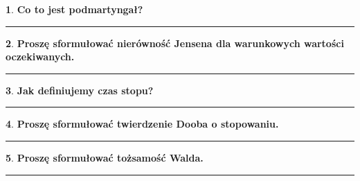 \documentclass[
    twocolumn,
    twoside,
    fontsize=11pt,
    paper=A0,
    DIV=30
]{scrartcl}
\theoremstyle{definition}
\newtheorem{pytanie}{}
\theoremstyle{break}
\newenvironment{odpowiedź}{\vspace{-0.7em}}{\vspace{0.3em}\hrule}
\begin{document}
\begin{pytanie}
\textbf{Co to jest podmartyngał?}
\end{pytanie}
\begin{odpowiedź}
\end{odpowiedź}


\begin{pytanie}
\textbf{Proszę sformułować nierówność Jensena dla warunkowych wartości oczekiwanych.}
\end{pytanie}
\begin{odpowiedź}
\end{odpowiedź}


\begin{pytanie}
\textbf{Jak definiujemy czas stopu?}
\end{pytanie}
\begin{odpowiedź}
\end{odpowiedź}


\begin{pytanie}
\textbf{Proszę sformułować twierdzenie Dooba o stopowaniu.}
\end{pytanie}
\begin{odpowiedź}
\end{odpowiedź}


\begin{pytanie}
\textbf{Proszę sformułować tożsamość Walda.}
\end{pytanie}
\begin{odpowiedź}
\end{odpowiedź}
\end{document}
